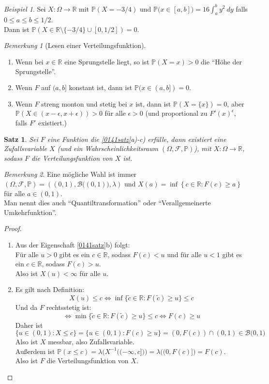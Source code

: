 \documentclass[10pt,a4paper]{article}
\newcommand{\R}{\ensuremath{\mathbb{R}}}
\newcommand{\la}{\ensuremath{\lambda}}
\newcommand{\Bor}{\mathscr B}
\newcommand{\Prb}{\mathbb P}
\newcommand{\scF}{\ensuremath{\mathscr{F}}}
\theoremstyle{plain}
\newtheorem{satz}[theorem]{Satz}
\theoremstyle{definition}
\theoremstyle{remark}
\newtheorem*{bem*}{Bemerkung}
\newtheorem{exm}[theorem]{Beispiel}
\begin{document}
	\begin{exm}
		Sei $X:\Omega\to\R$ mit $\Prb(X=-3/4)$ und $\Prb\big(x\in[a,b]\big)=16\int_{a}^{b}y^2~dy$ falls $0\leq a\leq b\leq 1/2$.\\
		Dann ist $\Prb(X\in\R\setminus\{-3/4\}\cup [0,1/2])=0$.
	\end{exm}

	\begin{bem*}[Lesen einer Verteilungsfunktion]
		\begin{enumerate}
			\item Wenn bei $x\in\R$ eine Sprungstelle liegt, so ist $\Prb(X=x)>0$ die \enquote{Höhe der Sprungstelle}.
			\item Wenn $F$ auf $(a,b]$ konstant ist, dann ist $\Prb(x\in(a,b])=0$.
			\item Wenn $F$ streng monton und stetig bei $x$ ist, dann ist $\Prb(X=\{x\})=0$, aber $\Prb(X\in(x-\epsilon,x+\epsilon))>0$ für alle $\epsilon>0$ (und proportional zu $F'(x)^\epsilon$, falls $F'$ existiert.)
		\end{enumerate}
	\end{bem*}

	\begin{satz}\label{0143satz}
		Sei $F$ eine Funktion die \ref{0141satz}a)-c) erfülle, dann existiert eine Zufallsvariable $X$ (und ein Wahrscheinlichkeitsraum $(\Omega,\scF,\Prb)$), mit $X:\Omega\to \R$, sodass $F$ die Verteilungsfunktion von $X$ ist.
	\end{satz}
	\begin{bem*}
		Eine mögliche Wahl ist immer $(\Omega,\scF,\Prb)=((0,1),\Bor\big((0,1)\big),\la)$ und $X(a)=\inf\left\{c\in\R:F(c)\geq a\right\}$ für alle $a\in(0,1)$.\\
		Man nennt dies auch \enquote{Quantiltransformation} oder \enquote{Verallgemeinerte Umkehrfunktion}.
	\end{bem*}
	\begin{proof}
		\begin{enumerate}
			\item Aus der Eigenschaft \ref{0141satz}b) folgt:\\
			Für alle $u>0$ gibt es ein $c\in\R$, sodass $F(c)<u$ und für alle $u<1$ gibt es ein $c\in\R$, sodass $F(c)>u$.\\
			Also ist $X(u)<\infty$ für alle $u$.
			\item Es gilt nach Definition:
			\[X(u)\leq c\Leftrightarrow \inf\{\tilde c\in\R:F(\tilde c)\geq u\}\leq c\]
			Und da $F$ rechtsstetig ist:
			\[\Leftrightarrow\min\{\tilde c\in\R:F(\tilde c)\geq u\}\leq c\Leftrightarrow F(c)\geq u\]
			Daher ist 
			\[\{u\in(0,1):X\leq c\}=\{u\in(0,1):F(c)\geq u\}=(0,F(c))\cap(0,1)\in\Bor\big(0,1\big)\]
			Also ist $X$ messbar, also Zufallsvariable.\\
			Außerdem ist $\Prb(x\leq c)=\la\big(X^{-1}\big((-\infty,c]\big)\big)=\la\big((0,F(c)]\big)=F(c)$.\\
			Also ist $F$ die Verteilungsfunktion von $X$.
		\end{enumerate}
	\end{proof}
\end{document}
